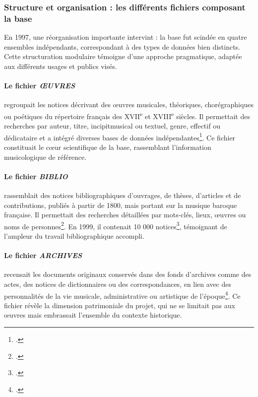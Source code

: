 \subsubsection{Structure et organisation : les différents fichiers composant la base}

En 1997, une réorganisation importante intervint : la base fut scindée en quatre ensembles indépendants, correspondant à des types de données bien distincts. Cette structuration modulaire témoigne d'une approche pragmatique, adaptée aux différents usages et publics visés.

\paragraph{Le fichier \textit{ŒUVRES}} regroupait les notices décrivant des œuvres musicales, théoriques, chorégraphiques ou poétiques du répertoire français des XVII\textsuperscript{e} et XVIII\textsuperscript{e} siècles. Il permettait des recherches par auteur, titre, \gls{incipitmusical} ou textuel, genre, effectif ou dédicataire et a intégré diverses bases de données indépendantes\footcite[Conseil scientifique d'octobre 1997]{michelbenoitDocumentationTechniqueBibliographique1997}. Ce fichier constituait le cœur scientifique de la base, rassemblant l'information musicologique de référence.

\paragraph{Le fichier \textit{BIBLIO}} rassemblait des notices bibliographiques d'ouvrages, de thèses, d'articles et de contributions, publiés à partir de 1800, mais portant sur la musique baroque française. Il permettait des recherches détaillées par mots-clés, lieux, œuvres ou noms de personnes\footcite[Conseil scientifique d'octobre 1997]{michelbenoitDocumentationTechniqueBibliographique1997}. En 1999, il contenait 10 000 notices\footcite[Conseil scientifique de février 1999]{michelbenoitDocumentationTechniqueBibliographique1997}, témoignant de l'ampleur du travail bibliographique accompli.

\paragraph{Le fichier \textit{ARCHIVES}} recensait les documents originaux conservés dans des fonds d'archives comme des actes, des notices de dictionnaires ou des correspondances, en lien avec des personnalités de la vie musicale, administrative ou artistique de l'époque\footcite[Conseil scientifique d'octobre 1997]{michelbenoitDocumentationTechniqueBibliographique1997}. Ce fichier révèle la dimension patrimoniale du projet, qui ne se limitait pas aux œuvres mais embrassait l'ensemble du contexte historique.

